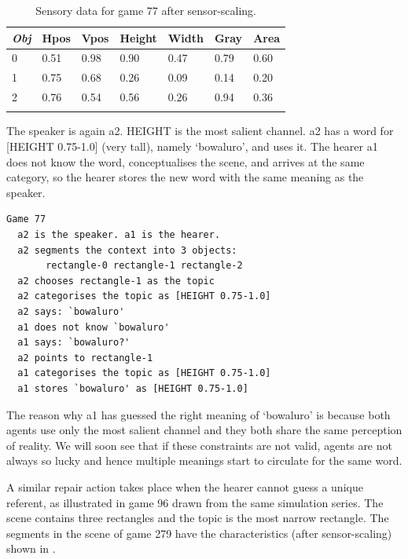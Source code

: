 \begin{table}
\begin{center}
\begin{tabular}{ l  l  l  l  l  l  l }
\lsptoprule
{\itshape Obj} & Hpos & Vpos & Height & Width & Gray & Area \\ \midrule
0 & 0.51 & 0.98 & 0.90 & 0.47 & 0.79 & 0.60\\ 
1 & 0.75 & 0.68 & 0.26 & 0.09 & 0.14 & 0.20\\ 
2 & 0.76 & 0.54 & 0.56 & 0.26 & 0.94 & 0.36\\ 
\lspbottomrule
\end{tabular}
\caption{\label{tab:game77} Sensory data for game 77 after sensor-scaling.}
\end{center}
\end{table}
The speaker is again {\bfshape  a2}. HEIGHT is the most salient channel. 
{\bfshape  a2} has a word for [HEIGHT 0.75-1.0] (very tall), namely
`bowaluro', and uses it. The hearer {\bfshape  a1} 
does not know the 
word, conceptualises the scene, and arrives at the 
same category, so the hearer stores the new word
with the same meaning as the speaker. 
\begin{verbatim}
Game 77
  a2 is the speaker. a1 is the hearer. 
  a2 segments the context into 3 objects: 
       rectangle-0 rectangle-1 rectangle-2
  a2 chooses rectangle-1 as the topic 
  a2 categorises the topic as [HEIGHT 0.75-1.0]
  a2 says: `bowaluro'
  a1 does not know `bowaluro'
  a1 says: `bowaluro?'
  a2 points to rectangle-1
  a1 categorises the topic as [HEIGHT 0.75-1.0]
  a1 stores `bowaluro' as [HEIGHT 0.75-1.0]
\end{verbatim}
The reason why {\bfshape  a1} has guessed the right 
meaning of `bowaluro' is because both agents use
only the most salient channel and they both share
the same perception of reality. We will soon see 
that if these constraints are not valid, agents 
are not always so lucky and hence multiple meanings
start to circulate for the same word. 

A similar repair action takes place when the hearer
cannot guess a unique referent, as illustrated in
game 96 drawn from the same simulation series. 
The scene contains three rectangles and the 
topic is the most narrow rectangle. The segments in the scene of game 279
have the characteristics (after sensor-scaling) shown in . 


